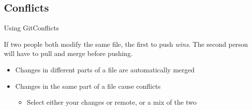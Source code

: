\documentclass[10pt,compress]{beamer} %
\begin{document}
\subsection{Conflicts}
\begin{frame}{Using Git}{Conflicts}

If two people both modify the same file, the first to push \emph{wins}.
The second person will have to pull and merge before pushing.

\begin{itemize}
	\item Changes in different parts of a file are automatically merged
	\item Changes in the same part of a file cause conflicts
	\begin{itemize}
		\item Select either your changes or remote, or a mix of the two
	\end{itemize}
\end{itemize}
\end{frame}






\end{document}
